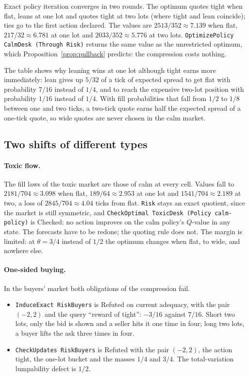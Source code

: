 \documentclass[11pt]{article}
\newcommand{\code}[1]{\texttt{#1}}
\theoremstyle{definition}
\theoremstyle{plain}
\begin{document}
Exact policy iteration converges in two rounds. The optimum quotes tight when flat, leans at one
lot and quotes tight at two lots (where tight and lean coincide); ties go to the first action declared.
The values are $2513/352\approx7.139$ when flat, $217/32\approx6.781$ at one lot and
$2033/352\approx5.776$ at two lots. \code{OptimizePolicy CalmDesk (Through Risk)} returns the same value
as the unrestricted optimum, which Proposition~\ref{prop:pullback} predicts: the compression costs
nothing.

The table shows why leaning wins at one lot although tight earns more immediately: lean gives up
$5/32$ of a tick of expected spread to get flat with probability $7/16$ instead of $1/4$, and to reach
the expensive two-lot position with probability $1/16$ instead of $1/4$. With fill probabilities that
fall from $1/2$ to $1/8$ between one and two ticks, a two-tick quote earns half the expected spread of
a one-tick quote, so wide quotes are never chosen in the calm market.

\subsection{Two shifts of different types}

\paragraph{Toxic flow.} The fill laws of the toxic market are those of calm at every cell. Values
fall to $2181/704\approx3.098$ when flat, $189/64\approx2.953$ at one lot and $1541/704\approx2.189$
at two, a loss of $2845/704\approx4.04$ ticks from flat. \code{Risk} stays an exact quotient, since the
market is still symmetric, and \code{CheckOptimal ToxicDesk (Policy calm-policy)} is Checked: no
action improves on the calm policy's $Q$-value in any state. The forecasts have to be redone; the
quoting rule does not. The margin is limited: at $\theta=3/4$ instead of $1/2$ the optimum changes when
flat, to wide, and nowhere else.

\paragraph{One-sided buying.} In the buyers' market both obligations of the compression fail.
\begin{itemize}
\item \code{InduceExact RiskBuyers} is Refuted on current adequacy, with the pair $(-2,2)$ and the
query ``reward of tight'': $-3/16$ against $7/16$. Short two lots, only the bid is shown and a seller
hits it one time in four; long two lots, a buyer lifts the ask three times in four.
\item \code{CheckUpdates RiskBuyers} is Refuted with the pair $(-2,2)$, the action tight, the one-lot
bucket and the masses $1/4$ and $3/4$. The total-variation lumpability defect is $1/2$.
\end{itemize}
\end{document}
